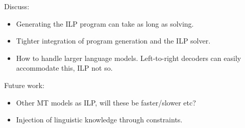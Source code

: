 Discuss:
\begin{itemize}
\item Generating the ILP program can take as long as solving.
\item Tighter integration of program generation and the ILP solver.
\item How to handle larger language models.  Left-to-right decoders
  can easily accommodate this, ILP not so.
\end{itemize}

Future work:
\begin{itemize}
\item Other MT models as ILP, will these be faster/slower etc?
\item Injection of linguistic knowledge through constraints.
\end{itemize}

